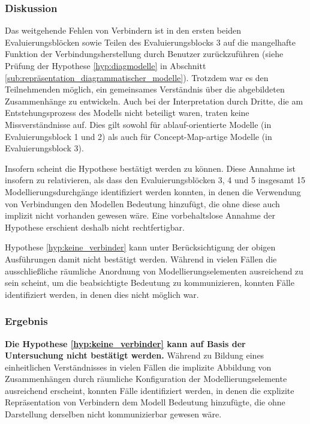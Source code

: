 \subsubsection{Diskussion} %

Das weitgehende Fehlen von Verbindern ist in den ersten beiden Evaluierungsblöcken sowie Teilen des Evaluierungsblocks 3 auf die mangelhafte Funktion der Verbindungsherstellung durch Benutzer zurückzuführen (siehe Prüfung der Hypothese \ref{hyp:diagmodelle} in Abschnitt \ref{sub:repräsentation_diagrammatischer_modelle}). Trotzdem war es den Teilnehmenden möglich, ein gemeinsames Verständnis über die abgebildeten Zusammenhänge zu entwickeln. Auch bei der Interpretation durch Dritte, die am Entstehungsprozess des Modells nicht beteiligt waren, traten keine Missverständnisse auf. Dies gilt sowohl für ablauf-orientierte Modelle (in Evaluierungsblock 1 und 2) als auch für Concept-Map-artige Modelle (in Evaluierungsblock 3).

Insofern scheint die Hypothese bestätigt werden zu können. Diese Annahme ist insofern zu relativieren, als dass den Evaluierungsblöcken 3, 4 und 5 insgesamt 15 Modellierungsdurchgänge identifiziert werden konnten, in denen die Verwendung von Verbindungen den Modellen Bedeutung hinzufügt, die ohne diese auch implizit nicht vorhanden gewesen wäre. Eine vorbehaltslose Annahme der Hypothese erschient deshalb nicht rechtfertigbar.

Hypothese \ref{hyp:keine_verbinder} kann unter Berücksichtigung der obigen Ausführungen damit nicht bestätigt werden. Während in vielen Fällen die ausschließliche räumliche Anordnung von Modellierungselementen ausreichend zu sein scheint, um die beabsichtigte Bedeutung zu kommunizieren, konnten Fälle identifiziert werden, in denen dies nicht möglich war.

\subsubsection{Ergebnis} %

\textbf{Die Hypothese \ref{hyp:keine_verbinder} kann auf Basis der Untersuchung nicht bestätigt werden.} Während zu Bildung eines einheitlichen Verständnisses in vielen Fällen die implizite Abbildung von Zusammenhängen durch räumliche Konfiguration der Modellierungselemente ausreichend erscheint, konnten Fälle identifiziert werden, in denen die explizite Repräsentation von Verbindern dem Modell Bedeutung hinzufügte, die ohne Darstellung derselben nicht kommunizierbar gewesen wäre.

